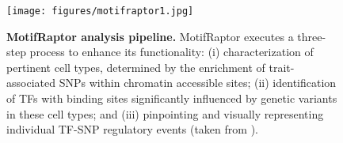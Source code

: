 \documentclass[a4paper, titlepage, openright]{book}
\newcommand{\motifraptor}{MotifRaptor\xspace}
\begin{document}
\begin{figure}
    \centering
    \texttt{[image: figures/motifraptor1.jpg]}
    \caption[\motifraptor analysis pipeline]{\textbf{\motifraptor analysis pipeline.} \motifraptor executes a three-step process to enhance its functionality: (i) characterization of pertinent cell types, determined by the enrichment of trait-associated SNPs within chromatin accessible sites; (ii) identification of TFs with binding sites significantly influenced by genetic variants in these cell types; and (iii) pinpointing and visually representing individual TF-SNP regulatory events (taken from \cite{yao2021motif}).}
    \label{fig:motifraptor-pipeline}
\end{figure} 

\end{document}
